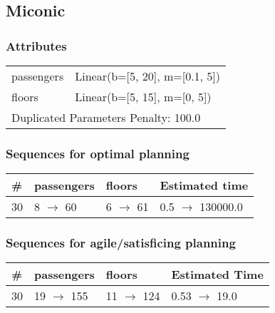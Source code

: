 \documentclass{article}
\begin{document}
                            \newpage \subsection{Miconic}
                    \subsubsection*{Attributes}
                    \begin{tabular}{@{}p{}p{}@{}}
                    \toprule
                    passengers & Linear(b=[5, 20], m=[0.1, 5])\\
floors & Linear(b=[5, 15], m=[0, 5]) \\
                    \bottomrule
                    \multicolumn{2}{l}{Duplicated Parameters Penalty: 100.0}
                    \end{tabular}
                
                            \subsubsection*{Sequences for optimal planning}

                            \begin{center}
                            \begin{tabular}{@{}l|l|l|l@{}}
                            \# & passengers & floors & Estimated time\\\midrule
                            30&8 $\rightarrow$ 60&6 $\rightarrow$ 61&0.5 $\rightarrow$ 130000.0
                            \end{tabular}
                            \end{center}
                    
                         \subsubsection*{Sequences for agile/satisficing planning}

                        \begin{center}
                        \begin{tabular}{@{}l|l|l|l@{}}
                        \# & passengers & floors & Estimated Time\\\midrule
                        30&19 $\rightarrow$ 155&11 $\rightarrow$ 124&0.53 $\rightarrow$ 19.0
                        \end{tabular}
                        \end{center}
                    
\end{document}
